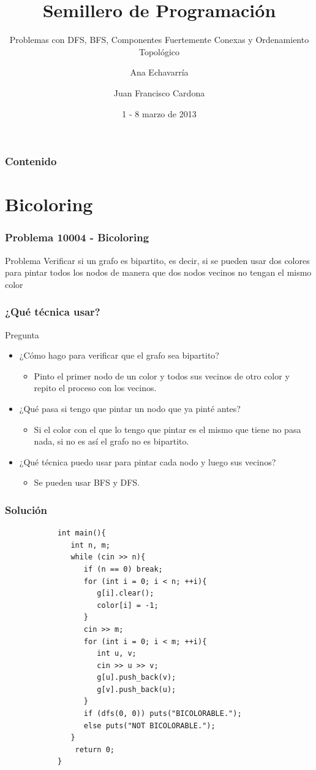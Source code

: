 \documentclass{beamer}
\title{Semillero de Programación}
\subtitle{Problemas con DFS, BFS, Componentes Fuertemente Conexas y Ordenamiento Topológico}
\author{Ana Echavarría \and Juan Francisco Cardona}
\institute{Universidad EAFIT}
\date{1 - 8 marzo de 2013}
\begin{document}
\begin{frame}
	\titlepage
\end{frame}

\begin{frame}
	\frametitle{Contenido}
	\tableofcontents
\end{frame}

\section{Bicoloring}
	\begin{frame}
		\frametitle{Problema 10004 - Bicoloring}
		\begin{block}{Problema}
			Verificar si un grafo es bipartito, es decir, si se pueden usar dos colores para pintar todos los nodos de manera que dos nodos vecinos no tengan el mismo color
		\end{block}
	\end{frame}
	
	\begin{frame}
		\frametitle{¿Qué técnica usar?}
		\begin{alertblock}{Pregunta}
				\begin{itemize}
					\item ¿Cómo hago para verificar que el grafo sea bipartito? \pause
						\begin{itemize}
							\item Pinto el primer nodo de un color y todos sus vecinos de otro color y repito el proceso con los vecinos. \pause
						\end{itemize}
					\item ¿Qué pasa si tengo que pintar un nodo que ya pinté antes? \pause
						\begin{itemize}
							\item Si el color con el que lo tengo que pintar es el mismo que tiene no pasa nada, si no es así el grafo no es bipartito.
						\end{itemize}
					\item ¿Qué técnica puedo usar para pintar cada nodo y luego sus vecinos? \pause
						\begin{itemize}
							\item Se pueden usar BFS y DFS.
						\end{itemize}
				\end{itemize}
		\end{alertblock}
	\end{frame}
	
	\begin{frame}[fragile]
		\frametitle{Solución}
		\begin{lstlisting}
			int main(){
			   int n, m;
			   while (cin >> n){
			      if (n == 0) break;
			      for (int i = 0; i < n; ++i){
			         g[i].clear();
			         color[i] = -1;
			      }
			      cin >> m;
			      for (int i = 0; i < m; ++i){
			         int u, v;
			         cin >> u >> v;
			         g[u].push_back(v);
			         g[v].push_back(u);
			      }
			      if (dfs(0, 0)) puts("BICOLORABLE.");
			      else puts("NOT BICOLORABLE.");
			   }
			    return 0;
			}
		\end{lstlisting}
	\end{frame}
	
\end{document}
